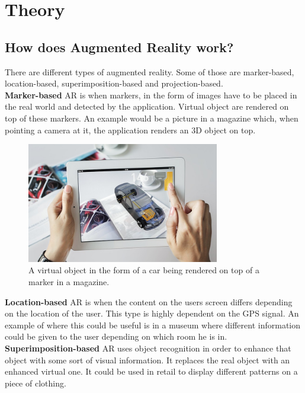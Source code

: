 \section{Theory}

\subsection{How does Augmented Reality work?}
There are different types of augmented reality. Some of those are marker-based, location-based, superimposition-based and projection-based. \\

\textbf{Marker-based} AR is when markers, in the form of images have to be placed in the real world and detected by the application. Virtual object are rendered on top of these markers. An example would be a picture in a magazine which, when pointing a camera at it, the application renders an 3D object on top.\\

\begin{figure}[hbtp]
\begin{center}
\includegraphics[width = 0.75\textwidth]{./Images/markerbasedar.jpg} 
\caption{A virtual object in the form of a car being rendered on top of a marker in a magazine.}
\end{center}
\end{figure}

\textbf{Location-based} AR is when the content on the users screen differs depending on the location of the user. This type is highly dependent on the GPS signal.
An example of where this could be useful is in a museum where different information could be given to the user depending on which room he is in.\\

\textbf{Superimposition-based} AR uses object recognition in order to enhance that object with some sort of visual information. It replaces the real object with an enhanced virtual one. It could be used in retail to display different patterns on a piece of clothing.\\

